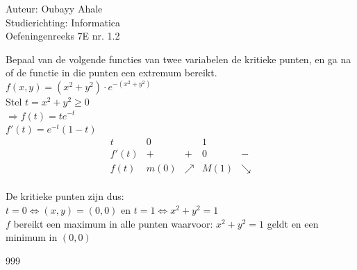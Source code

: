 \documentclass[a4paper]{article}
\begin{document}
\noindent \large Auteur: Oubayy Ahale       \\
\noindent \large Studierichting: Informatica\\
\noindent \large Oefeningenreeks 7E nr. 1.2 \\

\medskip

\normalsize

Bepaal van de volgende functies van twee variabelen de kritieke punten, en ga na of de functie in die punten een extremum bereikt.\\

$ f(x,y) = \left(x^2 + y^2\right) \cdot e^{-\left(x^2 + y^2\right)} $\\

Stel $ t = x^2 + y^2 \ge 0$\\

$ \Rightarrow f(t) = te^{-t} $\\

$ f'(t) = e^{-t}(1 - t)  $\\

\[
\begin{array}{c|cccc}
 t & 0 &  & 1 &  \\
 \hline
 f'(t) & + & + & 0 & - \\
 f(t)  & m(0) & \nearrow & M(1) & \searrow
\end{array}
\]\\

De kritieke punten zijn dus:\\

$ t = 0 \Leftrightarrow (x,y) = (0,0)$ en $ t = 1 \Leftrightarrow x^2 + y^2 = 1 $\\

$f$ bereikt een maximum in alle punten waarvoor: $x^2 + y^2 = 1$ geldt en een minimum in $(0,0)$\\

\begin{thebibliography}{999}
\end{thebibliography}
\end{document}
